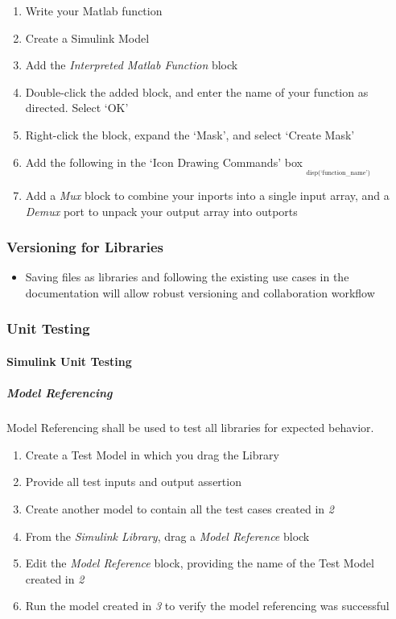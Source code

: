 \documentclass[]{article}
\providecommand{\tightlist}{%
  \setlength{\itemsep}{0pt}\setlength{\parskip}{0pt}}
\let\oldparagraph\paragraph
\renewcommand{\paragraph}[1]{\oldparagraph{#1}\mbox{}}
\let\oldsubparagraph\subparagraph
\renewcommand{\subparagraph}[1]{\oldsubparagraph{#1}\mbox{}}
\begin{document}
\begin{enumerate}
\def\labelenumi{\arabic{enumi}.}
\tightlist
\item
  Write your Matlab function
\item
  Create a Simulink Model
\item
  Add the \emph{Interpreted Matlab Function} block
\item
  Double-click the added block, and enter the name of your function as
  directed. Select `OK'
\item
  Right-click the block, expand the `Mask', and select `Create Mask'
\item
  Add the following in the `Icon Drawing Commands' box
  \textsubscript{\textsubscript{\textsubscript{ disp(`function\_name')
  }}}
\item
  Add a \emph{Mux} block to combine your inports into a single input
  array, and a \emph{Demux} port to unpack your output array into
  outports
\end{enumerate}

\subsubsection{Versioning for Libraries}\label{versioning-for-libraries}

\begin{itemize}
\tightlist
\item
  Saving files as libraries and following the existing use cases in the
  documentation will allow robust versioning and collaboration workflow
\end{itemize}

\subsubsection{Unit Testing}\label{unit-testing-1}

\paragraph{Simulink Unit Testing}\label{simulink-unit-testing}

\subparagraph{Model Referencing}\label{model-referencing-3}

Model Referencing shall be used to test all libraries for expected
behavior.

\begin{enumerate}
\def\labelenumi{\arabic{enumi}.}
\tightlist
\item
  Create a Test Model in which you drag the Library
\item
  Provide all test inputs and output assertion
\item
  Create another model to contain all the test cases created in \emph{2}
\item
  From the \emph{Simulink Library}, drag a \emph{Model Reference} block
\item
  Edit the \emph{Model Reference} block, providing the name of the Test
  Model created in \emph{2}
\item
  Run the model created in \emph{3} to verify the model referencing was
  successful
\end{enumerate}
\end{document}

